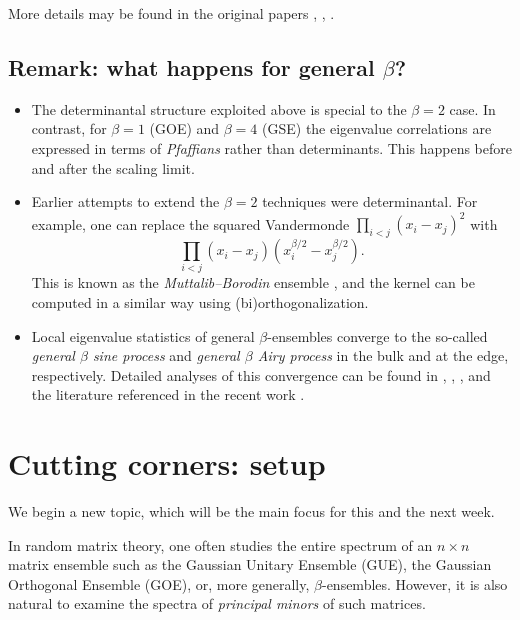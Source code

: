 \documentclass[letterpaper,11pt,oneside,reqno]{book}
\numberwithin{equation}{chapter}  %
\theoremstyle{definition}
\begin{document}
More details
may be found in the original papers
\cite{tracy1993level},
\cite{Forrester1993},
\cite{tracy_widom1994level_airy}.



\subsection{Remark: what happens for general $\beta$?}

\begin{itemize}
    \item The determinantal structure exploited above is special to the $\beta=2$ case. In contrast, for $\beta=1$ (GOE) and $\beta=4$ (GSE) the eigenvalue correlations are expressed in terms of \emph{Pfaffians} rather than determinants.
			This happens before and after the scaling limit.
		\item
			Earlier attempts to extend the $\beta=2$ techniques
			were determinantal. For example, one can replace the
			squared Vandermonde $\prod_{i<j} (x_i-x_j)^2$ with
			\begin{equation*}
			 \prod_{i<j} (x_i-x_j)(x_i^{\beta/2}-x_j^{\beta/2}).
			\end{equation*}
			This is known as the \emph{Muttalib--Borodin} ensemble
			\cite{forrester2017},
			and the kernel can be computed in a similar way using (bi)orthogonalization.
		\item Local eigenvalue statistics of general $\beta$-ensembles converge to the so-called
			\emph{general $\beta$ sine process}
			and
			\emph{general $\beta$ Airy process}
			in the bulk and at the edge, respectively.
			Detailed analyses of this convergence can be found in
			\cite{RamirezRiderVirag2006RandomAiry},
			\cite{valko2009continuum},
			\cite{gorin2018stochastic},
			and the literature referenced in the recent work
			\cite{gorin2024airy}.
\end{itemize}

\section{Cutting corners: setup}

We begin a new topic, which will be the main focus for this and the next week.

In random matrix theory, one often studies the entire spectrum of an $n\times n$ matrix ensemble such as the Gaussian Unitary Ensemble (GUE), the Gaussian Orthogonal Ensemble (GOE), or, more generally, $\beta$-ensembles. However, it is also natural to examine the spectra of \emph{principal minors} of such matrices.
\end{document}
